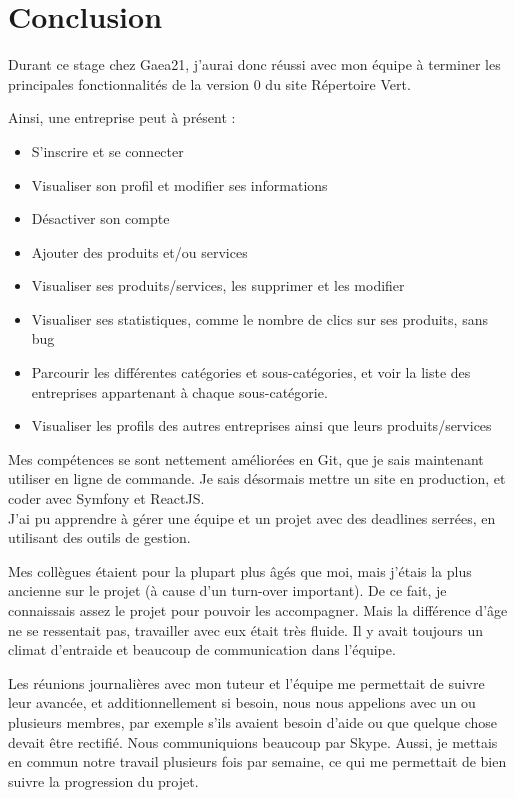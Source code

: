 \section*{Conclusion} 
{}
\thispagestyle{noTitledHeader}

Durant ce stage chez Gaea21, j'aurai donc réussi avec mon équipe à terminer les principales fonctionnalités de la version 0 du site Répertoire Vert.

Ainsi, une entreprise peut à présent :
\begin{itemize}
    \item S'inscrire et se connecter
    \item Visualiser son profil et modifier ses informations
    \item Désactiver son compte
    \item Ajouter des produits et/ou services
    \item Visualiser ses produits/services, les supprimer et les modifier
    \item Visualiser ses statistiques, comme le nombre de clics sur ses produits, sans bug
    \item Parcourir les différentes catégories et sous-catégories, et voir la liste des entreprises appartenant à chaque sous-catégorie.
    \item Visualiser les profils des autres entreprises ainsi que leurs produits/services
\end{itemize}

Mes compétences se sont nettement améliorées en Git, que je sais maintenant utiliser en ligne de commande.
Je sais désormais mettre un site en production, et coder avec Symfony et ReactJS.\\

J'ai pu apprendre à gérer une équipe et un projet avec des deadlines serrées, en utilisant des outils de gestion. 

Mes collègues étaient pour la plupart plus âgés que moi, mais j'étais la plus ancienne sur le projet (à cause d'un turn-over important). 
De ce fait, je connaissais assez le projet pour pouvoir les accompagner. Mais la différence d'âge ne se ressentait pas, travailler avec eux était très fluide.
Il y avait toujours un climat d'entraide et beaucoup de communication dans l'équipe.

Les réunions journalières avec mon tuteur et l'équipe me permettait de suivre leur avancée, et additionnellement si besoin, nous nous appelions avec un ou plusieurs membres, par exemple s'ils avaient besoin d'aide ou que quelque chose devait être rectifié.
Nous communiquions beaucoup par Skype.
Aussi, je mettais en commun notre travail plusieurs fois par semaine, ce qui me permettait de bien suivre la progression du projet.

